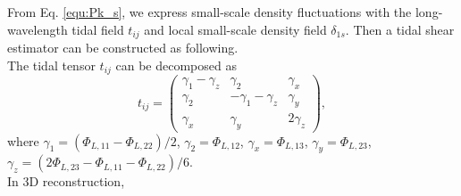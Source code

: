 From Eq. \eqref{equ:Pk_s}, we express small-scale density fluctuations
with the long-wavelength tidal field $t_{ij}$ and local small-scale
density field $\delta_{1s}$. Then a tidal shear estimator can be constructed
as following.\\

The tidal tensor $t_{ij}$ can be decomposed as
\begin{equation}
t_{ij}=
\begin{pmatrix}
\gamma_{1}-\gamma_{z} & \gamma_{2} & \gamma_{x} \\
\gamma_{2} & -\gamma_{1}-\gamma_{z} & \gamma_{y} \\
\gamma_{x} & \gamma_{y} & 2\gamma_{z}
\end{pmatrix},
\label{tij_c5}
\end{equation}
where
$\gamma_{1}=(\Phi_{L,11}-\Phi_{L,22})/2$,
$\gamma_{2}=\Phi_{L,12}$,
$\gamma_{x}=\Phi_{L,13}$,
$\gamma_{y}=\Phi_{L,23}$,
$\gamma_{z}=(2\Phi_{L,23}-\Phi_{L,11}-\Phi_{L,22})/6$.\\

In 3D reconstruction,
%

